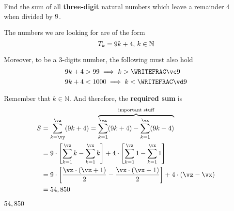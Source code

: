 

\vb\vc
{}\vb\vd

\DIVIDE\vc\va\vp
\DIVIDE\vd\va\vq

\FLOOR\vp\vx
\CEIL\vp\vy
\FLOOR\vq\vz

\question[4] Find the sum of all \textbf{three-digit} natural numbers which leave a 
remainder $4$ when divided by $9$.

\watchout

\begin{solution}[\halfpage]
  The numbers we are looking for are of the form 
  \[ T_k = 9 k + 4,\,k\in\mathbb{N} \] 

  Moreover, to be a 3-digits number, the following must also hold
  \begin{align}
    \va k + \vb &> 99 \implies k > \WRITEFRAC\vc\va  \\
    \va k + \vb &< 1000 \implies k < \WRITEFRAC\vd\va 
  \end{align} 

  Remember that $k\in\mathbb{N}$. And therefore, the \textbf{required sum} is 
  \begin{align}
    S &= \sum_{k=\vy}^{\vz}(\va k + \vb) = 
    \overbrace{\sum_{k=1}^{\vz} (\va k + \vb) - \sum_{k=1}^{\vx} (\va k + \vb)}^{\text{important stuff}} \\
     &= \va\cdot\left[ \sum_{k=1}^{\vz} k - \sum_{k=1}^{\vx} k \right] 
      + \vb\cdot\left[ \sum_{k=1}^{\vz} 1 - \sum_{k=1}^{\vx} 1 \right] \\
     &= \va\cdot\left[ \dfrac{\vz\cdot (\vz + 1)}{2} - \dfrac{\vx\cdot(\vx + 1)}{2}\right] + \vb\cdot (\vz - \vx) \\
     &= \vo
  \end{align}

\end{solution}
\ifprintanswers\begin{codex}$54,850$\end{codex}\fi
